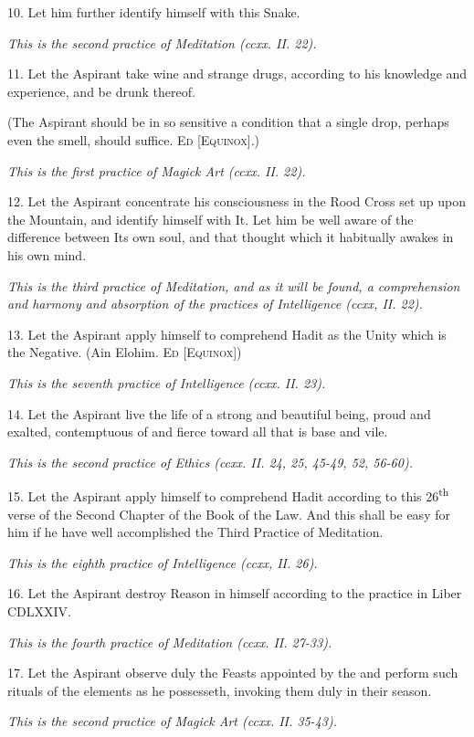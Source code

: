 10. Let him further identify himself with this Snake.

\textit{This is the second practice of Meditation (ccxx. II. 22).}

11. Let the Aspirant take wine and strange drugs, according to his knowledge and experience, and be drunk thereof.

(The Aspirant should be in so sensitive a condition that a single drop, perhaps even the smell, should suffice. \textsc{Ed [Equinox]}.)

\textit{This is the first practice of Magick Art (ccxx. II. 22).}

12. Let the Aspirant concentrate his consciousness in the Rood Cross set up upon the Mountain, and identify himself with It. Let him be well aware of the difference between Its own soul, and that thought which it habitually awakes in his own mind.

\textit{This is the third practice of Meditation, and as it will be found, a comprehension and harmony and absorption of the practices of Intelligence (ccxx, II. 22).}

13. Let the Aspirant apply himself to comprehend Hadit as the Unity which is the Negative. (Ain Elohim. \textsc{Ed [Equinox]})

\textit{This is the seventh practice of Intelligence (ccxx. II. 23).}

14. Let the Aspirant live the life of a strong and beautiful being, proud and exalted, contemptuous of and fierce toward all that is base and vile.

\textit{This is the second practice of Ethics (ccxx. II. 24, 25, 45-49, 52, 56-60).}

15. Let the Aspirant apply himself to comprehend Hadit according to this 26\textsuperscript{th} verse of the Second Chapter of the Book of the Law. And this shall be easy for him if he have well accomplished the Third Practice of Meditation.

\textit{This is the eighth practice of Intelligence (ccxx, II. 26).}

16. Let the Aspirant destroy Reason in himself according to the practice in Liber CDLXXIV.

\textit{This is the fourth practice of Meditation (ccxx. II. 27-33).}

17.
Let the Aspirant observe duly the Feasts appointed by the \Argentium{} and perform such rituals of the elements as he possesseth, invoking them duly in their season.

\textit{This is the second practice of Magick Art (ccxx. II. 35-43).}

